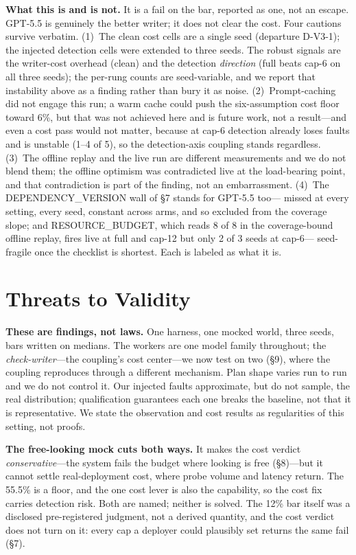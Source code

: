 \documentclass[acmsmall,screen]{acmart}
\begin{document}
\textbf{What this is and is not.} It is a fail on the bar, reported as one, not an
escape. GPT-5.5 is genuinely the better writer; it does not clear the cost. Four
cautions survive verbatim. (1)~The clean cost cells are a single seed (departure
D-V3-1); the injected detection cells were extended to three seeds. The robust
signals are the writer-cost overhead (clean) and the detection \emph{direction}
(full beats cap-6 on all three seeds); the per-rung counts are seed-variable, and
we report that instability above as a finding rather than bury it as noise.
(2)~Prompt-caching did not engage this run; a warm cache could push the
six-assumption cost floor toward 6\%, but that was not achieved here and is future
work, not a result---and even a cost pass would not matter, because at cap-6
detection already loses faults and is unstable (1--4 of 5), so the detection-axis
coupling stands regardless. (3)~The offline replay and the live run are different
measurements and we do not blend them; the offline optimism was contradicted live
at the load-bearing point, and that contradiction is part of the finding, not an
embarrassment. (4)~The DEPENDENCY\_VERSION wall of \S7 stands for GPT-5.5 too---
missed at every setting, every seed, constant across arms, and so excluded from
the coverage slope; and RESOURCE\_BUDGET, which reads 8 of 8 in the coverage-bound
offline replay, fires live at full and cap-12 but only 2 of 3 seeds at cap-6---
seed-fragile once the checklist is shortest. Each is labeled as what it is.

\section{Threats to Validity}
\textbf{These are findings, not laws.} One harness, one mocked world, three
seeds, bars written on medians. The workers are one model family throughout; the
\emph{check-writer}---the coupling's cost center---we now test on two (\S9), where
the coupling reproduces through a different mechanism. Plan shape varies run to
run and we do not control it. Our injected faults approximate, but do not sample, the real
distribution; qualification guarantees each one breaks the baseline, not that it
is representative. We state the observation and cost results as regularities of
this setting, not proofs.

\textbf{The free-looking mock cuts both ways.} It makes the cost verdict
\emph{conservative}---the system fails the budget where looking is free
(\S8)---but it cannot settle real-deployment cost, where probe volume and
latency return. The 55.5\% is a floor, and the one cost lever is also the
capability, so the cost fix carries detection risk. Both are named; neither is
solved. The 12\% bar itself was a disclosed pre-registered judgment, not a
derived quantity, and the cost verdict does not turn on it: every cap a deployer
could plausibly set returns the same fail (\S7).
\end{document}
